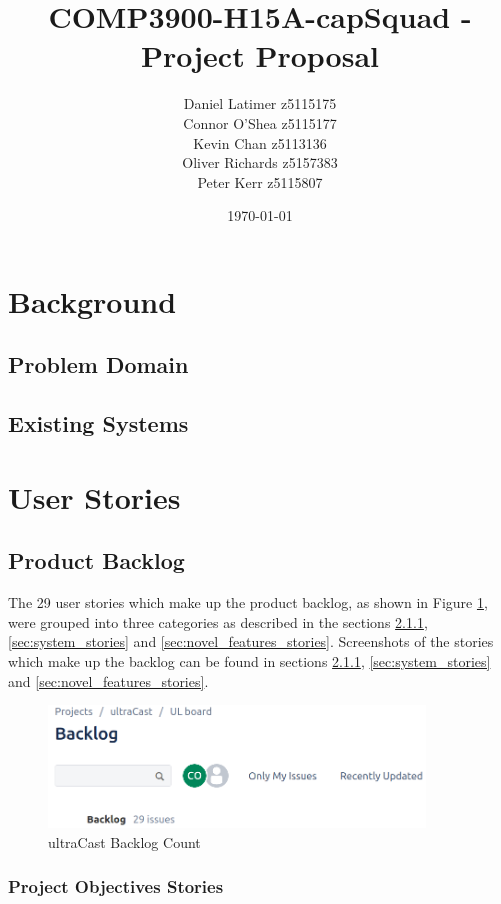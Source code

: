 \documentclass[12pt]{article}
\title{COMP3900-H15A-capSquad - Project Proposal}
\date{\today}
\author{Daniel Latimer z5115175 \\ Connor O'Shea z5115177 \\ Kevin Chan z5113136 \\ Oliver Richards z5157383 \\ Peter Kerr z5115807}
\begin{document}
\maketitle
\tableofcontents
\newpage

\section{Background}

\subsection{Problem Domain}
\subsection{Existing Systems}

\section{User Stories}

\subsection{Product Backlog}

The 29 user stories which make up the product backlog, as shown in Figure \ref{fig:backlog}, were grouped into three categories as described in the sections \ref{sec:project_objectives_stories}, \ref{sec:system_stories} and \ref{sec:novel_features_stories}.
Screenshots of the stories which make up the backlog can be found in sections \ref{sec:project_objectives_stories}, \ref{sec:system_stories} and \ref{sec:novel_features_stories}.

\begin{figure}[ht]
    \centering
    \includegraphics[width=10cm]{resources/project_backlog}
    \caption{ultraCast Backlog Count}
    \label{fig:backlog}
\end{figure}

\subsubsection{Project Objectives Stories} \label{sec:project_objectives_stories}
\end{document}
